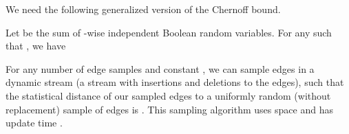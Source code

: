 We need the following generalized version of the Chernoff bound.

\begin{lemma}\label{lm:Kchernoff}
Let  be the sum of -wise independent Boolean random variables. For any  such that , we have

\end{lemma}

\begin{lemma}\label{lm:updatetime}
For any number  of edge samples and constant , we can sample  edges in a dynamic stream (a stream with insertions and deletions to the edges), such that the statistical distance of our sampled edges to a uniformly random (without replacement) sample of  edges is . This sampling algorithm uses  space and has update time .
\end{lemma}
